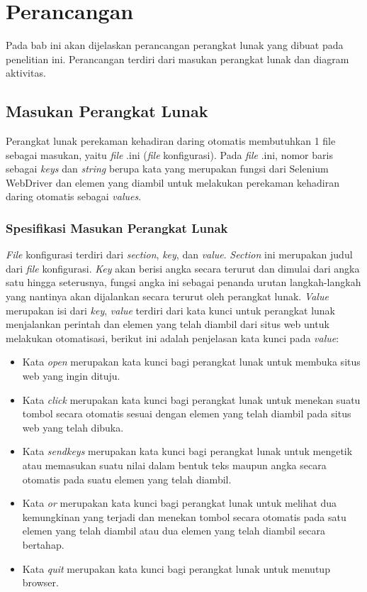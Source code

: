 \chapter{Perancangan}
\label{chap:perancangan}
Pada bab ini akan dijelaskan perancangan perangkat lunak yang dibuat pada penelitian ini. Perancangan terdiri dari masukan perangkat lunak dan diagram aktivitas. 

\section{Masukan Perangkat Lunak}
\label{sec:inputConfig} 
Perangkat lunak perekaman kehadiran daring otomatis membutuhkan 1 file sebagai masukan, yaitu \textit{file} .ini (\textit{file} konfigurasi). Pada \textit{file} .ini, nomor baris sebagai \textit{keys} dan \textit{string} berupa kata yang merupakan fungsi dari Selenium WebDriver dan elemen yang diambil untuk melakukan perekaman kehadiran daring otomatis sebagai \textit{values}. 

\subsection{Spesifikasi Masukan Perangkat Lunak}
\textit{File} konfigurasi terdiri dari \textit{section}, \textit{key}, dan \textit{value}. \textit{Section} ini merupakan judul dari \textit{file} konfigurasi. \textit{Key} akan berisi angka secara terurut dan dimulai dari angka satu hingga seterusnya, fungsi angka ini sebagai penanda urutan langkah-langkah yang nantinya akan dijalankan secara terurut oleh perangkat lunak. \textit{Value} merupakan isi dari \textit{key}, \textit{value} terdiri dari kata kunci untuk perangkat lunak menjalankan perintah dan elemen yang telah diambil dari situs web untuk melakukan otomatisasi, berikut ini adalah penjelasan kata kunci pada \textit{value}:
\begin{itemize}
	\item Kata \textit{open} merupakan kata kunci bagi perangkat lunak untuk membuka situs web yang ingin dituju. 
	\item Kata \textit{click} merupakan kata kunci bagi perangkat lunak untuk menekan suatu tombol secara otomatis sesuai dengan elemen yang telah diambil pada situs web yang telah dibuka.
	\item Kata \textit{sendkeys} merupakan kata kunci bagi perangkat lunak untuk mengetik atau memasukan suatu nilai dalam bentuk teks maupun angka secara otomatis pada suatu elemen yang telah diambil.
	\item Kata \textit{or} merupakan kata kunci bagi perangkat lunak untuk melihat dua kemungkinan yang terjadi dan menekan tombol secara otomatis pada satu elemen yang telah diambil atau dua elemen yang telah diambil secara bertahap.  
	\item Kata \textit{quit} merupakan kata kunci bagi perangkat lunak untuk menutup browser.
\end{itemize}

